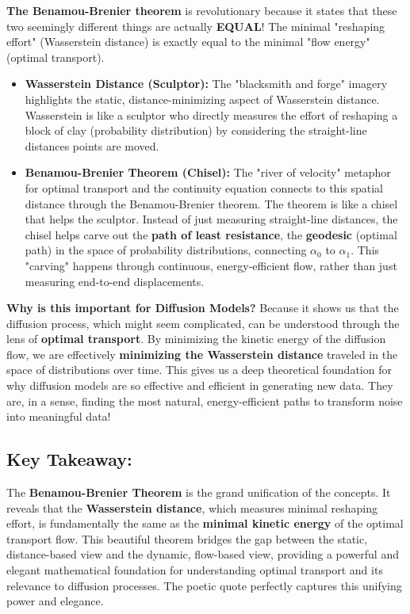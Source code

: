 \documentclass{article}
\begin{document}
\textbf{The Benamou-Brenier theorem} is revolutionary because it states that these two seemingly different things are actually \textbf{EQUAL}! The minimal "reshaping effort" (Wasserstein distance) is exactly equal to the minimal "flow energy" (optimal transport).

\begin{itemize}
    \item \textbf{Wasserstein Distance (Sculptor):}  The "blacksmith and forge" imagery highlights the static, distance-minimizing aspect of Wasserstein distance. Wasserstein is like a sculptor who directly measures the effort of reshaping a block of clay (probability distribution) by considering the straight-line distances points are moved.
    \item \textbf{Benamou-Brenier Theorem (Chisel):} The "river of velocity" metaphor for optimal transport and the continuity equation connects to this spatial distance through the Benamou-Brenier theorem.  The theorem is like a chisel that helps the sculptor. Instead of just measuring straight-line distances, the chisel helps carve out the \textbf{path of least resistance}, the \textbf{geodesic} (optimal path) in the space of probability distributions, connecting \( \alpha_0 \) to \( \alpha_1 \). This "carving" happens through continuous, energy-efficient flow, rather than just measuring end-to-end displacements.
\end{itemize}


\textbf{Why is this important for Diffusion Models?}  Because it shows us that the diffusion process, which might seem complicated, can be understood through the lens of \textbf{optimal transport}. By minimizing the kinetic energy of the diffusion flow, we are effectively \textbf{minimizing the Wasserstein distance} traveled in the space of distributions over time. This gives us a deep theoretical foundation for why diffusion models are so effective and efficient in generating new data.  They are, in a sense, finding the most natural, energy-efficient paths to transform noise into meaningful data!

\subsection*{Key Takeaway:}

The \textbf{Benamou-Brenier Theorem} is the grand unification of the concepts. It reveals that the \textbf{Wasserstein distance}, which measures minimal reshaping effort, is fundamentally the same as the \textbf{minimal kinetic energy} of the optimal transport flow. This beautiful theorem bridges the gap between the static, distance-based view and the dynamic, flow-based view, providing a powerful and elegant mathematical foundation for understanding optimal transport and its relevance to diffusion processes. The poetic quote perfectly captures this unifying power and elegance.
\end{document}
